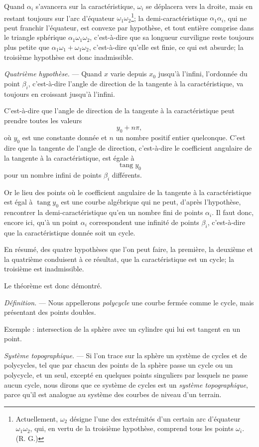 \documentclass[11pt]{article}
\begin{document}
Quand $\alpha_i$ s’avancera sur la caractéristique, $\omega_i$ se déplacera vers la droite, mais en restant toujours sur l’arc d’équateur $\omega_1\omega_2$\footnote{Actuellement, $\omega_2$ désigne l’une des extrémités d’un certain arc d’équateur $\omega_1\omega_2$, qui, en vertu de la troisième hypothèse, comprend tous les points $\omega_i$. (R. G.)}; la demi-caractéristique $\alpha_1\alpha_i$, qui ne peut franchir l’équateur, est convexe par hypothèse, et tout entière comprise dans le triangle sphérique $\alpha_1\omega_1\omega_2$, c’est-à-dire que sa longueur curviligne reste toujours plus petite que $\alpha_1\omega_1+\omega_1\omega_2$, c’est-à-dire qu’elle est finie, ce qui est absurde; la troisième hypothèse est donc inadmissible.

\emph{Quatrième hypothèse.} --- Quand $x$ varie depuis $x_0$ jusqu’à l’infini, l’ordonnée du point $\beta_i$, c’est-à-dire l’angle de direction de la tangente à la caractéristique, va toujours en croissant jusqu’à l’infini.

C’est-à-dire que l’angle de direction de la tangente à la caractéristique peut prendre toutes les valeurs
\[
y_0+n\pi,
\]
où $y_0$ est une constante donnée et $n$ un nombre positif entier quelconque. C’est dire que la tangente de l’angle de direction, c’est-à-dire le coefficient angulaire de la tangente à la caractéristique, est égale à
\[
\operatorname{tang} y_0
\]
pour un nombre infini de points $\beta_i$ différents.

Or le lieu des points où le coefficient angulaire de la tangente à la caractéristique est égal à $\operatorname{tang} y_0$ est une courbe algébrique qui ne peut, d’après l’hypothèse, rencontrer la demi-caractéristique qu’en un nombre fini de points $\alpha_i$. Il faut donc, encore ici, qu’à un point $\alpha_i$ correspondent une infinité de points $\beta_i$, c’est-à-dire que la caractéristique donnée soit un cycle.

En résumé, des quatre hypothèses que l’on peut faire, la première, la deuxième et la quatrième conduisent à ce résultat, que la caractéristique est un cycle; la troisième est inadmissible.

Le théorème est donc démontré.

\emph{Définition.} --- Nous appellerons \emph{polycycle} une courbe fermée comme le cycle, mais présentant des points doubles.

Exemple : intersection de la sphère avec un cylindre qui lui est tangent en un point.

\emph{Système topographique.} --- Si l’on trace sur la sphère un système de cycles et de polycycles, tel que par chacun des points de la sphère passe un cycle ou un polycycle, et un seul, excepté en quelques points singuliers par lesquels ne passe aucun cycle, nous dirons que ce système de cycles est un \emph{système topographique}, parce qu’il est analogue au système des courbes de niveau d’un terrain.
\end{document}
